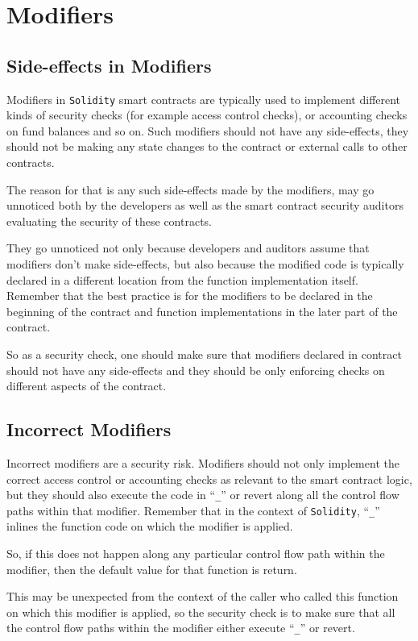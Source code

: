 \section{Modifiers}\label{modifiers}

\subsection{Side-effects in Modifiers}\label{side-effects-in-modifiers}

Modifiers in \texttt{Solidity} smart contracts are typically used to
implement different kinds of security checks (for example access control
checks), or accounting checks on fund balances and so on. Such modifiers
should not have any side-effects, they should not be making any state
changes to the contract or external calls to other contracts.

The reason for that is any such side-effects made by the modifiers, may
go unnoticed both by the developers as well as the smart contract
security auditors evaluating the security of these contracts.

They go unnoticed not only because developers and auditors assume that
modifiers don't make side-effects, but also because the modified code is
typically declared in a different location from the function
implementation itself. Remember that the best practice is for the
modifiers to be declared in the beginning of the contract and function
implementations in the later part of the contract.

So as a security check, one should make sure that modifiers declared in
contract should not have any side-effects and they should be only
enforcing checks on different aspects of the contract.

\subsection{Incorrect Modifiers}\label{incorrect-modifiers}

Incorrect modifiers are a security risk. Modifiers should not only
implement the correct access control or accounting checks as relevant to
the smart contract logic, but they should also execute the code in
``\texttt{\_}'' or revert along all the control flow paths within that
modifier. Remember that in the context of \texttt{Solidity},
``\texttt{\_}'' inlines the function code on which the modifier is
applied.

So, if this does not happen along any particular control flow path
within the modifier, then the default value for that function is return.

This may be unexpected from the context of the caller who called this
function on which this modifier is applied, so the security check is to
make sure that all the control flow paths within the modifier either
execute ``\texttt{\_}'' or revert.
